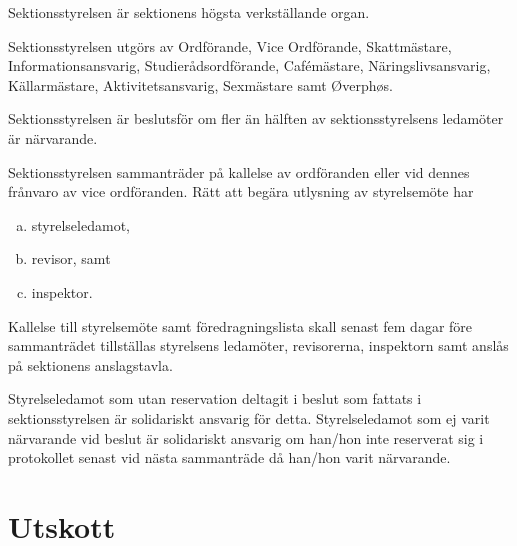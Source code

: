 \documentclass[stadgar]{dsekprotokoll}
\begin{document}
\begin{stadgeavsnitt}


Sektionsstyrelsen är sektionens högsta verkställande organ.


Sektionsstyrelsen utgörs av Ordförande, Vice Ordförande, Skattmästare, Informationsansvarig, Studierådsordförande, Cafémästare, Näringslivsansvarig, Källarmästare, Aktivitetsansvarig, Sexmästare samt Øverphøs.


Sektionsstyrelsen är beslutsför om fler än hälften av sektionsstyrelsens
ledamöter är närvarande.


Sektionsstyrelsen sammanträder på kallelse av ordföranden eller vid dennes
frånvaro av vice ordföranden. Rätt att begära utlysning av styrelsemöte
har
\begin{enumerate}[a)]
\item styrelseledamot,
\item revisor, samt
\item inspektor.
\end{enumerate}


Kallelse till styrelsemöte samt föredragningslista skall senast fem dagar före sammanträdet tillställas styrelsens ledamöter,
revisorerna, inspektorn samt anslås på sektionens anslagstavla.


Styrelseledamot som utan reservation deltagit i beslut som fattats i
sektionsstyrelsen är solidariskt ansvarig för detta. Styrelseledamot som ej
varit närvarande vid beslut är solidariskt ansvarig om han/hon inte
reserverat sig i protokollet senast vid nästa sammanträde då han/hon varit
närvarande.

\end{stadgeavsnitt}

\section{Utskott}
\end{document}

